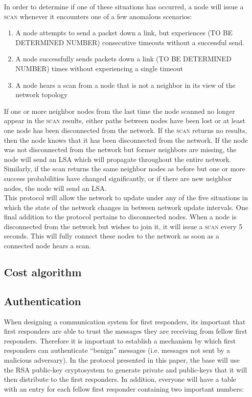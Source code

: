\documentclass[letterpaper]{article}
\begin{document}
\noindent In order to determine if one of these situations has occurred, a node will issue a 
\textsc{scan} whenever it encounters one of a few anomalous scenarios:

\begin{enumerate}
  \item A node attempts to send a packet down a link, but experiences (TO BE DETERMINED NUMBER) 
  consecutive timeouts without a successful send.
  \item A node successfully sends packets down a link (TO BE DETERMINED NUMBER) times without
  experiencing a single timeout
  \item A node hears a scan from a node that is not a neighbor in its view of the network topology
\end{enumerate}

\noindent If one or more neighbor nodes from the last time the node scanned no longer appear in 
the \textsc{scan} results, either paths between nodes have been lost or at least one node has
been disconnected from the network. If the \textsc{scan} returns no results, then the node knows
that it has been disconnected from the network. If the node was not disconnected from the network
but former neighbors are missing, the node will send an LSA which will propagate throughout the
entire network. Similarly, if the scan returns the same neighbor nodes as before but one or more
success probabilities have changed significantly, or if there are new neighbor nodes, the node will
send an LSA.
\\

\noindent This protocol will allow the network to update under any of the five situations in which
the state of the network changes in between network update intervals. One final addition to the
protocol pertains to disconnected nodes. When a node is disconnected from the network but wishes to
join it, it will issue a \textsc{scan} every 5 seconds. This will fully connect these nodes to the
network as soon as a connected node hears a scan. 

\subsection{Cost algorithm}

\subsection{Authentication}
When designing a communication system for first responders, its important that first responders are able to trust the messages they are receiving from fellow first responders. Therefore it is important to establish a mechanism by which first responders can authenticate “benign” messages (i.e. messages not sent by a malicious adversary). In the protocol presented in this paper, the base will use the RSA public-key cryptosystem to generate private and public-keys that it will then distribute to the first responders. In addition, everyone will have a table with an entry for each fellow first responder containing two important numbers:
\end{document}
